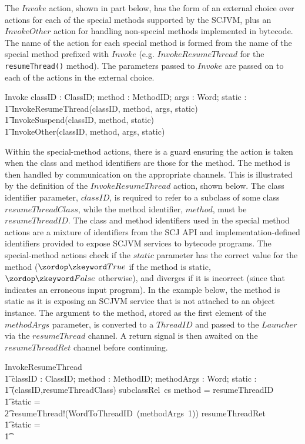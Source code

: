 The $Invoke$ action, shown in part below, has the form of an external
choice over actions for each of the special methods supported by the
SCJVM, plus an $InvokeOther$ action for handling non-special methods
implemented in bytecode.
The name of the action for each special method is formed from the name
of the special method prefixed with $Invoke$ (e.g. 
$InvokeResumeThread$ for the \texttt{resumeThread()} method).
The parameters passed to $Invoke$ are passed on to
each of the actions in the external choice.
\begin{circusaction}
  Invoke \circdef \circval classID : ClassID; \circval method : MethodID; \circval args : \seq Word; \circval static : \boolean \circspot \\
  \t1 InvokeResumeThread(classID, method, args, static) \\
  \t1 {} \extchoice InvokeSuspend(classID, method, static) \extchoice \cdots \\
  \t1 {} \extchoice InvokeOther(classID, method, args, static)
\end{circusaction}

Within the special-method actions, there is a guard ensuring the
action is taken when the class and method identifiers are those for
the method.
The method is then handled by communication on the appropriate
channels.
This is illustrated by the definition of the $InvokeResumeThread$
action, shown below.
The class identifier parameter, $classID$, is required to refer to a
subclass of some class $resumeThreadClass$, while the method
identifier, $method$, must be $resumeThreadID$.
The class and method identifiers used in the special method actions
are a mixture of identifiers from the SCJ API and
implementation-defined identifiers provided to expose SCJVM services
to bytecode programs.
The special-method actions check if the $static$ parameter has the
correct value for the method ($\true$ if the method is static,
$\false$ otherwise), and diverges if it is incorrect (since that
indicates an erroneous input program).
In the example below, the method is static as it is exposing an SCJVM
service that is not attached to an object instance.
The argument to the method, stored as the first element of the
$methodArgs$ parameter, is converted to a $ThreadID$ and passed to the
$Launcher$ via the $resumeThread$ channel.
A return signal is then awaited on the $resumeThreadRet$ channel
before continuing.
\begin{circusaction}
  InvokeResumeThread \circdef \\
  \t1 \circval classID : ClassID; \circval method : MethodID; \circval methodArgs : \seq Word; \circval static : \boolean \circspot \\
  \t1 \lcircguard (classID,resumeThreadClass) \in subclassRel~cs \land method = resumeThreadID \rcircguard \circguard {} \\
  \t1 \circif static = \true \circthen {} \\
  \t2 resumeThread!(WordToThreadID~(methodArgs~1)) \then resumeThreadRet \then \Skip \\
  \t1 {} \circelse static = \false \circthen \Chaos \\
  \t1 \circfi
\end{circusaction}

